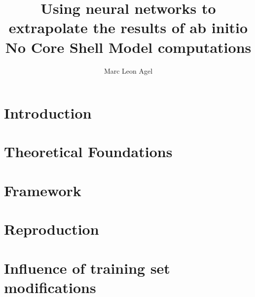 






\title{Using neural networks to extrapolate the results of
  ab initio No Core Shell Model computations}
\author{Marc Leon Agel}
\reviewer{ }


\submissiondate{\today}
\examdate{\today}

\maketitle

\affidavit

\tableofcontents

\chapter{Introduction}
\label{chap:introduction}


\chapter{Theoretical Foundations}
\label{chap:foundations}



\chapter{Framework}
\label{chap:framework}


\chapter{Reproduction}
\label{chap:reproduction}


\chapter{Influence of training set modifications}
\label{chap:extended}


